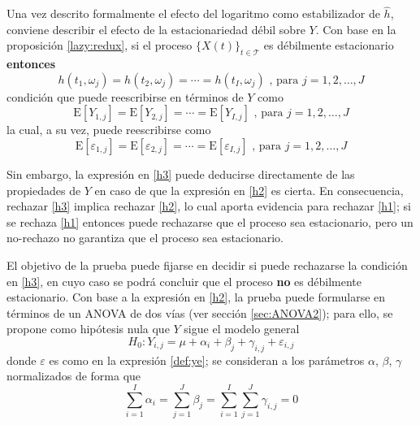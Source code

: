 \documentclass[12pt,letterpaper]{book}
\newcommand{\E}[1]{\mathrm{E}\left[ #1 \right]}
\newcommand{\xt}{$\{X(t)\}_{t\in \mathcal{T}}$ }
\begin{document}
Una vez descrito formalmente el efecto del logaritmo como estabilizador de $\widehat{h}$, conviene describir el efecto de la estacionariedad débil sobre $Y$.
%
Con base en la proposición \ref{lazy:redux}, si el proceso \xt es débilmente estacionario \textbf{entonces}
%
\begin{equation}
h(t_1,\omega_j) = h(t_2,\omega_j) = \cdots = h(t_I,\omega_j) \text{ , para } j = 1, 2, \dots , J
\label{h1}
\end{equation}
condición que puede reescribirse en términos de $Y$ como
%
\begin{equation}
\E{Y_{1,j}} = \E{Y_{2,j}} = \cdots = \E{Y_{I,j}} \text{ , para } j = 1, 2, \dots , J
\label{h2}
\end{equation}
%
la cual, a su vez, puede reescribirse como
\begin{equation}
\E{\varepsilon_{1,j}} = \E{\varepsilon_{2,j}} = \cdots = \E{\varepsilon_{I,j}} \text{ , para } j = 1, 2, \dots , J
\label{h3}
\end{equation}

Sin embargo, la expresión en \ref{h3} puede deducirse directamente de las propiedades de $Y$ en caso de que la expresión en \ref{h2} es cierta. 
%
En consecuencia, rechazar \ref{h3} implica rechazar \ref{h2}, lo cual aporta evidencia para rechazar \ref{h1}; si se rechaza \ref{h1} entonces puede rechazarse que el proceso sea estacionario, pero un no-rechazo no garantiza que el proceso sea estacionario.

El objetivo de la prueba puede fijarse en decidir si puede rechazarse la condición en \ref{h3}, en cuyo caso se podrá concluir que el proceso \textbf{no} es débilmente estacionario.
%
Con base a la expresión en \ref{h2}, la prueba puede formularse en términos de un ANOVA de dos vías (ver sección \ref{sec:ANOVA2}); para ello, se propone como hipótesis nula que $Y$ sigue el modelo general
%
\begin{equation}
H_0 : Y_{i,j} = \mu + \alpha_i + \beta_j + \gamma_{i,j} + \varepsilon_{i,j}
\end{equation}
%
donde $\varepsilon$ es como en la expresión \ref{def:ye}; se consideran a los parámetros $\alpha$, $\beta$, $\gamma$ normalizados de forma que
\begin{equation}
\sum_{i=1}^I \alpha_i = \sum_{j=1}^J \beta_j = \sum_{i=1}^I \sum_{j=1}^J \gamma_{i,j} = 0
\end{equation}
\end{document}
